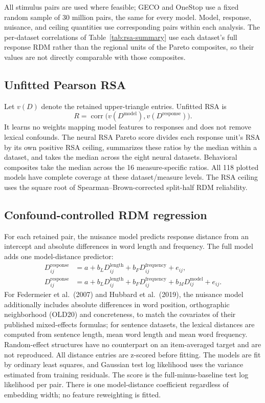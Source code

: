 All stimulus pairs are used where feasible; GECO and OneStop use a fixed random sample of 30 million pairs, the same for every model. Model, response, nuisance, and ceiling quantities use corresponding pairs within each analysis. The per-dataset correlations of Table~\ref{tab:rsa-summary} use each dataset's full response RDM rather than the regional units of the Pareto composites, so their values are not directly comparable with those composites.

\subsection{Unfitted Pearson RSA}
\label{app:rsa-scores}

Let $v(D)$ denote the retained upper-triangle entries. Unfitted RSA is
\[
R=\operatorname{corr}\bigl(v(D^{\mathrm{model}}),v(D^{\mathrm{response}})\bigr).
\]
It learns no weights mapping model features to responses and does not remove lexical confounds. The neural RSA Pareto score divides each response unit's RSA by its own positive RSA ceiling, summarizes these ratios by the median within a dataset, and takes the median across the eight neural datasets. Behavioral composites take the median across the 16 measure-specific ratios. All 118 plotted models have complete coverage at these dataset/measure levels. The RSA ceiling uses the square root of Spearman--Brown-corrected split-half RDM reliability.

\subsection{Confound-controlled RDM regression}
\label{app:rsa-cv}

For each retained pair, the nuisance model predicts response distance from an intercept and absolute differences in word length and frequency. The full model adds one model-distance predictor:
\begin{align*}
D^{\mathrm{response}}_{ij}&=a+b_LD^{\mathrm{length}}_{ij}+b_FD^{\mathrm{frequency}}_{ij}+e_{ij},\\
D^{\mathrm{response}}_{ij}&=a+b_LD^{\mathrm{length}}_{ij}+b_FD^{\mathrm{frequency}}_{ij}+b_MD^{\mathrm{model}}_{ij}+e_{ij}.
\end{align*}
For Federmeier et al.\ (2007) and Hubbard et al.\ (2019), the nuisance model additionally includes absolute differences in word position, orthographic neighborhood (OLD20) and concreteness, to match the covariates of their published mixed-effects formulas; for sentence datasets, the lexical distances are computed from sentence length, mean word length and mean word frequency. Random-effect structures have no counterpart on an item-averaged target and are not reproduced. All distance entries are z-scored before fitting. The models are fit by ordinary least squares, and Gaussian test log likelihood uses the variance estimated from training residuals. The score is the full-minus-baseline test log likelihood per pair. There is one model-distance coefficient regardless of embedding width; no feature reweighting is fitted.

